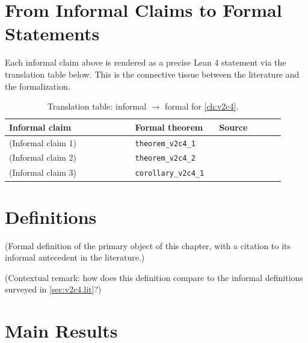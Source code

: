         \section{From Informal Claims to Formal Statements}
        \label{sec:v2c4.bridge}

        Each informal claim above is rendered as a precise Lean 4 statement
        via the translation table below.  This is the connective tissue
        between the literature and the formalization.

        \begin{table}[ht]
        \centering
        \begin{tabular}{p{0.42\linewidth} p{0.28\linewidth} p{0.22\linewidth}}
        \toprule
        \textbf{Informal claim} & \textbf{Formal theorem} & \textbf{Source} \\
        \midrule
        (Informal claim 1) & \texttt{theorem\_v2c4\_1} & \cite{lean4_tpil} \\
        (Informal claim 2) & \texttt{theorem\_v2c4\_2} & \cite{mathlib4} \\
        (Informal claim 3) & \texttt{corollary\_v2c4\_1} & \cite{mac_lane_1998} \\
        \bottomrule
        \end{tabular}
        \caption{Translation table: informal $\rightarrow$ formal for
        \cref{ch:v2c4}.}
        \label{tab:v2c4.bridge}
        \end{table}

        \section{Definitions}

        \begin{definition}
        \label{def:v2c4.1}
          (Formal definition of the primary object of this chapter, with
          a citation to its informal antecedent in the literature.)
        \end{definition}

        \begin{remark}
          (Contextual remark: how does this definition compare to the
          informal definitions surveyed in
          \cref{sec:v2c4.lit}?)
        \end{remark}

        \section{Main Results}

